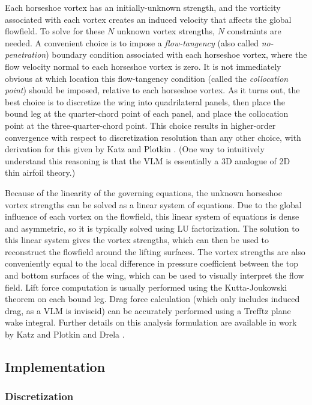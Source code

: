 Each horseshoe vortex has an initially-unknown strength, and the vorticity associated with each vortex creates an induced velocity that affects the global flowfield. To solve for these $N$ unknown vortex strengths, $N$ constraints are needed. A convenient choice is to impose a \emph{flow-tangency} (also called \emph{no-penetration}) boundary condition associated with each horseshoe vortex, where the flow velocity normal to each horseshoe vortex is zero. It is not immediately obvious at which location this flow-tangency condition (called the \emph{collocation point}) should be imposed, relative to each horseshoe vortex. As it turns out, the best choice is to discretize the wing into quadrilateral panels, then place the bound leg at the quarter-chord point of each panel, and place the collocation point at the three-quarter-chord point. This choice results in higher-order convergence with respect to discretization resolution than any other choice, with derivation for this given by Katz and Plotkin \cite{katz_lowspeed_2004}. (One way to intuitively understand this reasoning is that the VLM is essentially a 3D analogue of 2D thin airfoil theory.)

Because of the linearity of the governing equations, the unknown horseshoe vortex strengths can be solved as a linear system of equations. Due to the global influence of each vortex on the flowfield, this linear system of equations is dense and asymmetric, so it is typically solved using LU factorization. The solution to this linear system gives the vortex strengths, which can then be used to reconstruct the flowfield around the lifting surfaces. The vortex strengths are also conveniently equal to the local difference in pressure coefficient between the top and bottom surfaces of the wing, which can be used to visually interpret the flow field. Lift force computation is usually performed using the Kutta-Joukowski theorem on each bound leg. Drag force calculation (which only includes induced drag, as a VLM is inviscid) can be accurately performed using a Trefftz plane wake integral. Further details on this analysis formulation are available in work by Katz and Plotkin \cite{katz_lowspeed_2004} and Drela \cite{drela_flight_2013}.

\subsection{Implementation}

\subsubsection{Discretization}

